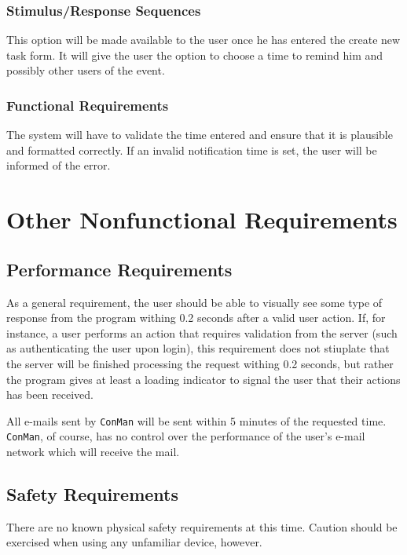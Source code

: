 \documentclass{article}
\begin{document}
\subsubsection{Stimulus/Response Sequences}
This option will be made available to the user once he has entered the create new task form. 
It will give the user the option to choose a time to remind him and possibly other users of the event. 
 
\subsubsection{Functional Requirements}
The system will have to validate the time entered and ensure that it is plausible and formatted correctly.  If an invalid notification time is set, the user will be informed of the error. 

\newpage
\section{Other Nonfunctional Requirements}
\subsection{Performance Requirements}
As a general requirement, the user should be able to visually see some type of response from the program withing 0.2 seconds after a valid user action.  
If, for instance, a user performs an action that requires validation from the server (such as authenticating the user upon login), this requirement does not stiuplate that the server will be finished processing the request withing 0.2 seconds, but rather the program gives at least a loading indicator to signal the user that their actions has been received.

All e-mails sent by \texttt{ConMan} will be sent within 5 minutes of the requested time.
\texttt{ConMan}, of course, has no control over the performance of the user's e-mail network which will receive the mail.


\subsection{Safety Requirements}
There are no known physical safety requirements at this time.  Caution should be exercised when using any unfamiliar device, however.\\
\end{document}
